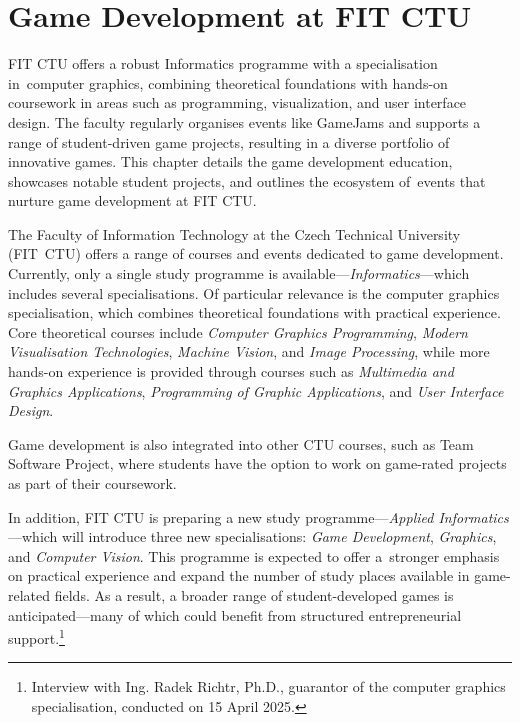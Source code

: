 \chapter{Game Development at FIT CTU}

\begin{chapterabstract}	
    FIT CTU offers a robust Informatics programme with a specialisation in~computer graphics, combining theoretical foundations with hands-on coursework in areas such as programming, visualization, and user interface design. The faculty regularly organises events like GameJams and supports a range of student-driven game projects, resulting in a diverse portfolio of innovative games. This chapter details the game development education, showcases notable student projects, and outlines the ecosystem of~events that nurture game development at FIT CTU.
\end{chapterabstract}

The Faculty of Information Technology at the Czech Technical University (FIT~CTU) offers a range of courses and events dedicated to game development. Currently, only a single study programme is available---\textit{Informatics}---which includes several specialisations. Of particular relevance is the computer graphics specialisation, which combines theoretical foundations with practical experience. Core theoretical courses include \textit{Computer Graphics Programming}, \textit{Modern Visualisation Technologies}, \textit{Machine Vision}, and \textit{Image Processing}, while more hands-on experience is provided through courses such as \textit{Multimedia and Graphics Applications}, \textit{Programming of Graphic Applications}, and \textit{User Interface Design}.
\cite{fit_graphics}

Game development is also integrated into other CTU courses, such as Team Software Project, where students have the option to work on game-rated projects as part of their coursework.
\cite{FIT_courses}

In addition, FIT CTU is preparing a new study programme---\textit{Applied Informatics}---which will introduce three new specialisations: \textit{Game Development}, \textit{Graphics}, and \textit{Computer Vision}. This programme is expected to offer a~stronger emphasis on practical experience and expand the number of study places available in game-related fields. As a result, a broader range of student-developed games is anticipated---many of which could benefit from structured entrepreneurial support.\footnote{Interview with Ing. Radek Richtr, Ph.D., guarantor of the computer graphics specialisation, conducted on 15 April 2025.}

